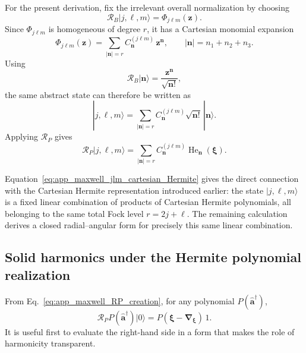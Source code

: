 \documentclass[11pt,oneside]{article}
\numberwithin{equation}{section}
\theoremstyle{definition}
\begin{document}
For the present derivation, fix the irrelevant overall normalization by
choosing
\begin{equation}
\mathcal R_B|j,\ell,m\rangle
=
\Phi_{j\ell m}(\bm z).
\end{equation}
Since $\Phi_{j\ell m}$ is homogeneous of degree $r$, it has a Cartesian
monomial expansion
\begin{equation}
\Phi_{j\ell m}(\bm z)
=
\sum_{|\bm n|=r}
C_{\bm n}^{(j\ell m)}\,
\bm z^{\bm n},
\qquad
|\bm n|
=
n_1+n_2+n_3.
\label{eq:app_maxwell_cartesian_monomial_expansion}
\end{equation}
Using
\begin{equation}
\mathcal R_B|\bm n\rangle
=
\frac{\bm z^{\bm n}}{\sqrt{\bm n!}},
\end{equation}
the same abstract state can therefore be written as
\begin{equation}
|j,\ell,m\rangle
=
\sum_{|\bm n|=r}
C_{\bm n}^{(j\ell m)}
\sqrt{\bm n!}\,
|\bm n\rangle .
\label{eq:app_maxwell_jlm_cartesian_Fock}
\end{equation}
Applying $\mathcal R_P$ gives
\begin{equation}
\mathcal R_P|j,\ell,m\rangle
=
\sum_{|\bm n|=r}
C_{\bm n}^{(j\ell m)}
\operatorname{He}_{\bm n}(\bm\xi).
\label{eq:app_maxwell_jlm_cartesian_Hermite}
\end{equation}

Equation~\eqref{eq:app_maxwell_jlm_cartesian_Hermite} gives the direct
connection with the Cartesian Hermite representation introduced earlier:
the state $|j,\ell,m\rangle$ is a fixed linear combination of products of
Cartesian Hermite polynomials, all belonging to the same total Fock level
$r=2j+\ell$.  The remaining calculation derives a closed radial--angular
form for precisely this same linear combination.

\subsection{Solid harmonics under the Hermite polynomial realization}

From Eq.~\eqref{eq:app_maxwell_RP_creation}, for any polynomial
$P(\hat{\bm a}^\dagger)$,
\begin{equation}
\mathcal R_P
P(\hat{\bm a}^\dagger)|0\rangle
=
P(\bm\xi-\bm\nabla_{\bm\xi})\,1.
\label{eq:app_maxwell_polynomial_creation_image}
\end{equation}
It is useful first to evaluate the right-hand side in a form that makes
the role of harmonicity transparent.
\end{document}
